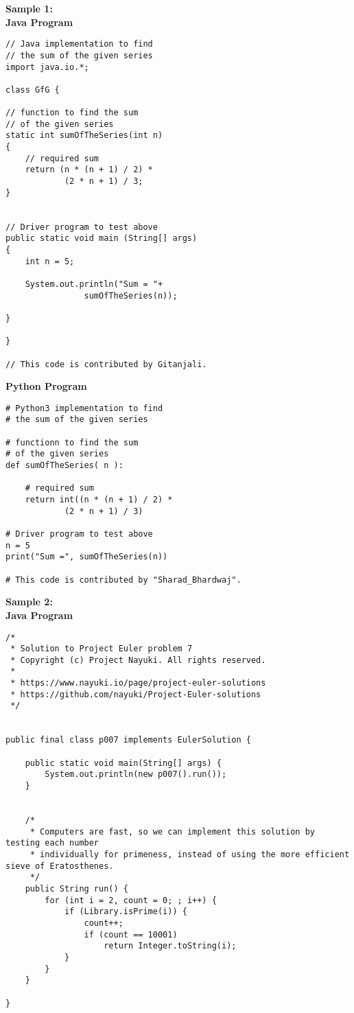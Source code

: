 \textbf{Sample 1:}\\ %
\textbf{Java Program}\\
\vspace*{-\baselineskip}
\begin{Verbatim}[frame=single]
// Java implementation to find  
// the sum of the given series 
import java.io.*; 
  
class GfG { 
      
// function to find the sum 
// of the given series 
static int sumOfTheSeries(int n) 
{ 
    // required sum 
    return (n * (n + 1) / 2) * 
            (2 * n + 1) / 3; 
} 
      
  
// Driver program to test above 
public static void main (String[] args)  
{ 
    int n = 5; 
      
    System.out.println("Sum = "+  
                sumOfTheSeries(n)); 
  
} 
  
} 
  
// This code is contributed by Gitanjali. 
\end{Verbatim}
\textbf{Python Program} \\
\vspace*{-\baselineskip}
\begin{Verbatim}[frame=single]
# Python3 implementation to find 
# the sum of the given series 
  
# functionn to find the sum 
# of the given series 
def sumOfTheSeries( n ): 
      
    # required sum 
    return int((n * (n + 1) / 2) *
            (2 * n + 1) / 3) 
              
# Driver program to test above 
n = 5
print("Sum =", sumOfTheSeries(n)) 
  
# This code is contributed by "Sharad_Bhardwaj". 
\end{Verbatim}
\newpage
\textbf{Sample 2:} \\ %
\textbf{Java Program} \\
\vspace*{-\baselineskip}
\begin{Verbatim}[frame=single, breaklines=true, breakanywhere=true]
/* 
 * Solution to Project Euler problem 7
 * Copyright (c) Project Nayuki. All rights reserved.
 * 
 * https://www.nayuki.io/page/project-euler-solutions
 * https://github.com/nayuki/Project-Euler-solutions
 */


public final class p007 implements EulerSolution {
	
	public static void main(String[] args) {
		System.out.println(new p007().run());
	}
	
	
	/* 
	 * Computers are fast, so we can implement this solution by testing each number
	 * individually for primeness, instead of using the more efficient sieve of Eratosthenes.
	 */
	public String run() {
		for (int i = 2, count = 0; ; i++) {
			if (Library.isPrime(i)) {
				count++;
				if (count == 10001)
					return Integer.toString(i);
			}
		}
	}
	
}
\end{Verbatim}
